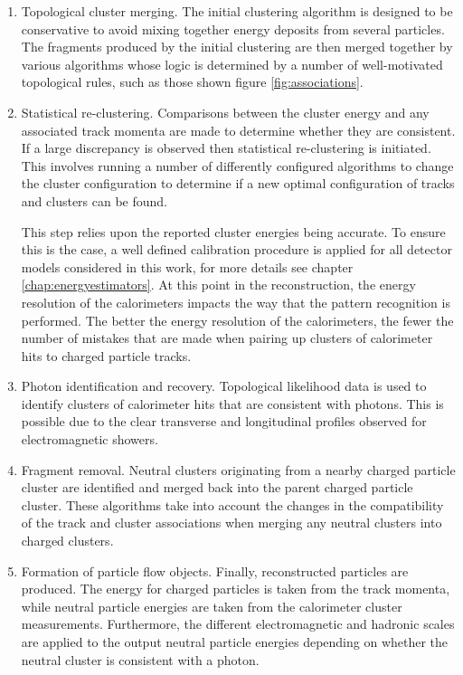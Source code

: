 \begin{enumerate}
\item Topological cluster merging.  The initial clustering algorithm is designed to be conservative to avoid mixing together energy deposits from several particles.  The fragments produced by the initial clustering are then merged together by various algorithms whose logic is determined by a number of well-motivated topological rules, such as those shown figure \ref{fig:associations}.  
\item Statistical re-clustering.  Comparisons between the cluster energy and any associated track momenta are made to determine whether they are consistent.  If a large discrepancy is observed then statistical re-clustering is initiated.  This involves running a number of differently configured algorithms to change the cluster configuration to determine if a new optimal configuration of tracks and clusters can be found.  

This step relies upon the reported cluster energies being accurate.  To ensure this is the case, a well defined calibration procedure is applied for all detector models considered in this work, for more details see chapter \ref{chap:energyestimators}.  At this point in the reconstruction, the energy resolution of the calorimeters impacts the way that the pattern recognition is performed.  The better the energy resolution of the calorimeters, the fewer the number of mistakes that are made when pairing up clusters of calorimeter hits to charged particle tracks.    

\item Photon identification and recovery.  Topological likelihood data is used to identify clusters of calorimeter hits that are consistent with photons.  This is possible due to the clear transverse and longitudinal profiles observed for electromagnetic showers.  
\item Fragment removal.  Neutral clusters originating from a nearby charged particle cluster are identified and merged back into the parent charged particle cluster.  These algorithms take into account the changes in the compatibility of the track and cluster associations when merging any neutral clusters into charged clusters.  
\item Formation of particle flow objects.  Finally, reconstructed particles are produced.  The energy for charged particles is taken from the track momenta, while neutral particle energies are taken from the calorimeter cluster measurements.  Furthermore, the different electromagnetic and hadronic scales are applied to the output neutral particle energies depending on whether the neutral cluster is consistent with a photon.  
\end{enumerate}

